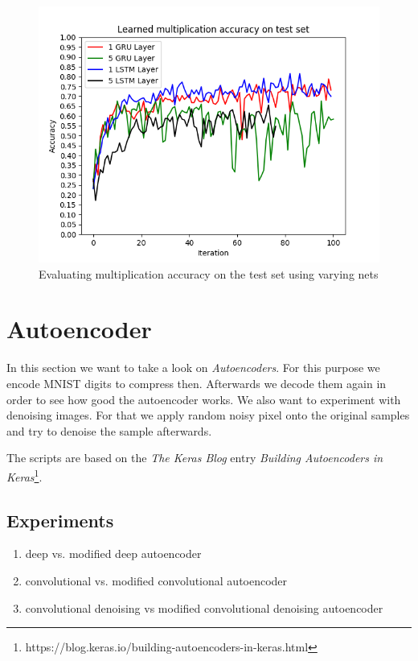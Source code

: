 \documentclass{article}[]
\begin{document}
\begin{figure}[H]
\centering
\includegraphics[width=1\linewidth]{img/multiply}
\caption{Evaluating multiplication accuracy on the test set using varying nets}
\label{fig:multiply}
\end{figure}

\section{Autoencoder}
\label{sec:autoencoder}
In this section we want to take a look on \emph{Autoencoders}.
For this purpose we encode MNIST digits to compress then.
Afterwards we decode them again in order to see how good the autoencoder works.
We also want to experiment with denoising images.
For that we apply random noisy pixel onto the original samples and try to denoise the sample afterwards.

The scripts are based on the \emph{The Keras Blog} entry \emph{Building Autoencoders in Keras}\footnote{https://blog.keras.io/building-autoencoders-in-keras.html}.

\subsection{Experiments}

\begin{enumerate}
	\item{deep vs. modified deep autoencoder}
	\item{convolutional vs. modified convolutional autoencoder}
	\item{convolutional denoising vs modified convolutional denoising autoencoder}
\end{enumerate}
\end{document}
